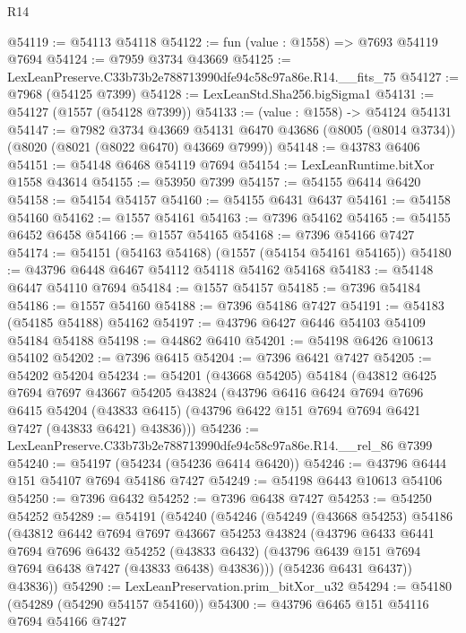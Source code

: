 \begin{lexlean}{R14}
\begin{coremodule}
@54119 := @54113 @54118
@54122 := fun (value : @1558) => @7693 @54119 @7694
@54124 := @7959 @3734 @43669
@54125 := LexLeanPreserve.C33b73b2e788713990dfe94c58c97a86e.R14.__fits_75
@54127 := @7968 (@54125 @7399)
@54128 := LexLeanStd.Sha256.bigSigma1
@54131 := @54127 (@1557 (@54128 @7399))
@54133 := (value : @1558) -> @54124 @54131
@54147 := @7982
    @3734
    @43669
    @54131
    @6470
    @43686
    (@8005 (@8014 @3734))
    (@8020 (@8021 (@8022 @6470) @43669 @7999))
@54148 := @43783 @6406
@54151 := @54148 @6468 @54119 @7694
@54154 := LexLeanRuntime.bitXor @1558 @43614
@54155 := @53950 @7399
@54157 := @54155 @6414 @6420
@54158 := @54154 @54157
@54160 := @54155 @6431 @6437
@54161 := @54158 @54160
@54162 := @1557 @54161
@54163 := @7396 @54162
@54165 := @54155 @6452 @6458
@54166 := @1557 @54165
@54168 := @7396 @54166 @7427
@54174 := @54151 (@54163 @54168) (@1557 (@54154 @54161 @54165))
@54180 := @43796 @6448 @6467 @54112 @54118 @54162 @54168
@54183 := @54148 @6447 @54110 @7694
@54184 := @1557 @54157
@54185 := @7396 @54184
@54186 := @1557 @54160
@54188 := @7396 @54186 @7427
@54191 := @54183 (@54185 @54188) @54162
@54197 := @43796 @6427 @6446 @54103 @54109 @54184 @54188
@54198 := @44862 @6410
@54201 := @54198 @6426 @10613 @54102
@54202 := @7396 @6415
@54204 := @7396 @6421 @7427
@54205 := @54202 @54204
@54234 := @54201
    (@43668 @54205)
    @54184
    (@43812
      @6425
      @7694
      @7697
      @43667
      @54205
      @43824
      (@43796
        @6416
        @6424
        @7694
        @7696
        @6415
        @54204
        (@43833 @6415)
        (@43796 @6422 @151 @7694 @7694 @6421 @7427 (@43833 @6421) @43836)))
@54236 := LexLeanPreserve.C33b73b2e788713990dfe94c58c97a86e.R14.__rel_86 @7399
@54240 := @54197 (@54234 (@54236 @6414 @6420))
@54246 := @43796 @6444 @151 @54107 @7694 @54186 @7427
@54249 := @54198 @6443 @10613 @54106
@54250 := @7396 @6432
@54252 := @7396 @6438 @7427
@54253 := @54250 @54252
@54289 := @54191
    (@54240
      (@54246
        (@54249
          (@43668 @54253)
          @54186
          (@43812
            @6442
            @7694
            @7697
            @43667
            @54253
            @43824
            (@43796
              @6433
              @6441
              @7694
              @7696
              @6432
              @54252
              (@43833 @6432)
              (@43796 @6439 @151 @7694 @7694 @6438 @7427 (@43833 @6438) @43836)))
          (@54236 @6431 @6437))
        @43836))
@54290 := LexLeanPreservation.prim_bitXor_u32
@54294 := @54180 (@54289 (@54290 @54157 @54160))
@54300 := @43796 @6465 @151 @54116 @7694 @54166 @7427

\end{coremodule}
\end{lexlean}
